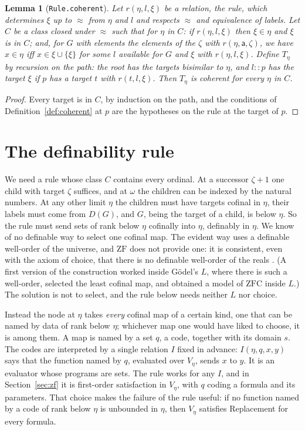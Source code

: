 \documentclass[10pt]{article}
\newtheorem{lemma}[theorem]{Lemma}
\theoremstyle{definition}
\theoremstyle{remark}
\newcommand{\ZF}{\mathrm{ZF}}
\newcommand{\ZFC}{\mathrm{ZFC}}
\newcommand{\la}{\mathsf{a}}
\newcommand{\lean}[1]{\texttt{#1}}
\begin{document}
\begin{lemma}[\lean{Rule.coherent}]\label{lem:rule}
Let $r(\eta,l,\xi)$ be a relation, the \emph{rule}, which determines $\xi$ up
to $\approx$ from $\eta$ and $l$ and respects $\approx$ and equivalence of labels. Let
$C$ be a class closed under $\approx$ such that for $\eta$ in $C$: if $r(\eta,l,\xi)$
then $\xi\in\eta$ and $\xi$ is in $C$; and, for $G$ with elements the
elements of the $\zeta$ with $r(\eta,\la,\zeta)$, we have $x\in\eta$ iff
$x\in\xi\cup\{\xi\}$ for some $l$ available for $G$ and $\xi$ with $r(\eta,l,\xi)$.
Define $T_\eta$ by recursion on the path: the root has the targets
bisimilar to $\eta$, and $l::p$ has the target $\xi$ if $p$ has a target $t$
with $r(t,l,\xi)$. Then $T_\eta$ is coherent for every $\eta$ in $C$.
\end{lemma}
\begin{proof}
Every target is in $C$, by induction on the path, and the conditions of
Definition~\ref{def:coherent} at $p$ are the hypotheses on the rule at the
target of $p$.
\end{proof}

\section{The definability rule}\label{sec:rule}

We need a rule whose class $C$ contains every ordinal. At a successor
$\zeta+1$ one child with target $\zeta$ suffices, and at $\omega$ the children can
be indexed by the natural numbers. At any other limit $\eta$ the children
must have targets cofinal in $\eta$, their labels must come from $D(G)$,
and $G$, being the target of a child, is below $\eta$. So the rule must
send sets of rank below $\eta$ cofinally into $\eta$, definably in $\eta$. We
know of no definable way to select one cofinal map. The evident way uses
a definable well-order of the universe, and $\ZF$ does not provide one:
it is consistent, even with the axiom of choice, that there is no
definable well-order of the reals \cite{feferman65}. (A first version of
the construction worked inside G\"odel's $L$, where there is such a
well-order, selected the least cofinal map, and obtained a model of
$\ZFC$ inside $L$.) The solution is not to select, and the rule below
needs neither $L$ nor choice.

Instead the node at $\eta$ takes \emph{every} cofinal map of a certain
kind, one that can be named by data of rank below $\eta$; whichever map one
would have liked to choose, it is among them. A map is named by a set
$q$, a code, together with its domain $s$. The codes are interpreted by a
single relation $I$ fixed in advance: $I(\eta,q,x,y)$ says that the
function named by $q$, evaluated over $V_\eta$, sends $x$ to $y$. It is an
evaluator whose programs are sets. The rule works for any $I$, and in
Section~\ref{sec:zf} it is first-order satisfaction in $V_\eta$, with $q$
coding a formula and its parameters. That choice makes the failure of
the rule useful: if no function named by a code of rank below $\eta$ is
unbounded in $\eta$, then $V_\eta$ satisfies Replacement for every formula.
\end{document}
